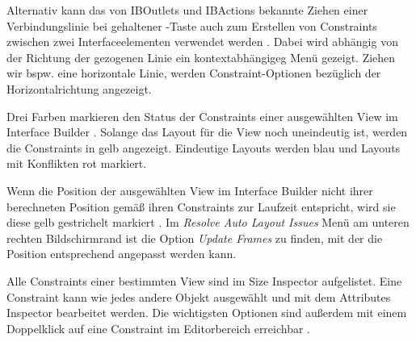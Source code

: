 \documentclass[parskip=half, final]{scrreprt}
\begin{document}

Alternativ kann das von IBOutlets und IBActions bekannte Ziehen einer Verbindungslinie bei gehaltener \keys{\ctrl}-Taste auch zum Erstellen von Constraints zwischen zwei Interfaceelementen verwendet werden . Dabei wird abhängig von der Richtung der gezogenen Linie ein kontextabhängigeg Menü gezeigt. Ziehen wir bspw. eine horizontale Linie, werden Constraint-Optionen bezüglich der Horizontalrichtung angezeigt.


Drei Farben markieren den Status der Constraints einer ausgewählten View im Interface Builder . Solange das Layout für die View noch uneindeutig ist, werden die Constraints in gelb angezeigt. Eindeutige Layouts werden blau und Layouts mit Konflikten rot markiert.


Wenn die Position der ausgewählten View im Interface Builder nicht ihrer berechneten Position gemäß ihren Constraints zur Laufzeit entspricht, wird sie diese gelb gestrichelt markiert . Im \emph{Resolve Auto Layout Issues} Menü am unteren rechten Bildschirmrand ist die Option \emph{Update Frames} zu finden, mit der die Position entsprechend angepasst werden kann.


Alle Constraints einer bestimmten View sind im Size Inspector aufgelistet. Eine Constraint kann wie jedes andere Objekt ausgewählt und mit dem Attributes Inspector bearbeitet werden. Die wichtigsten Optionen sind außerdem mit einem Doppelklick auf eine Constraint im Editorbereich erreichbar .

\end{document}
